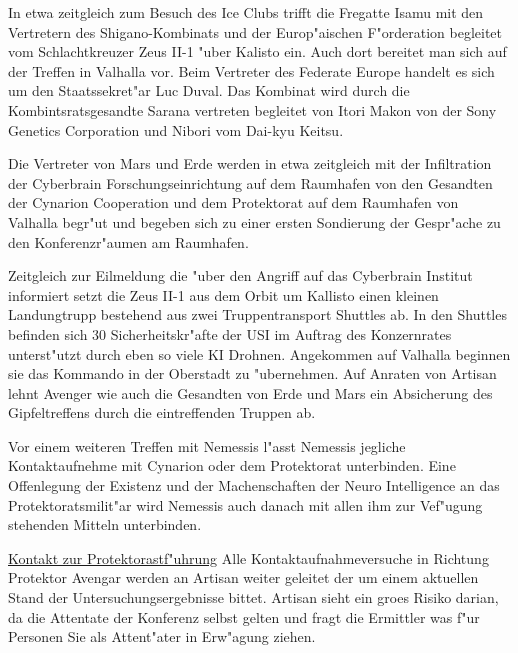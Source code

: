 In etwa zeitgleich zum Besuch des Ice Clubs trifft die Fregatte Isamu mit den Vertretern des Shigano-Kombinats und der Europ"aischen F"orderation begleitet vom Schlachtkreuzer Zeus II-1 "uber Kalisto ein. Auch dort bereitet man sich auf der Treffen in Valhalla vor.
Beim Vertreter des Federate Europe handelt es sich um den Staatssekret"ar Luc Duval. Das Kombinat wird durch die Kombintsratsgesandte Sarana vertreten begleitet von Itori Makon von der Sony Genetics Corporation und Nibori vom Dai-kyu Keitsu.

Die Vertreter von Mars und Erde werden in etwa zeitgleich mit der Infiltration der Cyberbrain Forschungseinrichtung auf dem Raumhafen von den Gesandten der Cynarion Cooperation und dem Protektorat auf dem Raumhafen von Valhalla begr"u\3t und begeben sich zu einer ersten Sondierung der Gespr"ache zu den Konferenzr"aumen am Raumhafen.


Zeitgleich zur Eilmeldung die "uber den Angriff auf das Cyberbrain Institut informiert setzt die Zeus II-1 aus dem Orbit um Kallisto einen kleinen Landungtrupp bestehend aus zwei Truppentransport Shuttles ab. In den Shuttles befinden sich 30 Sicherheitskr"afte der USI im Auftrag des Konzernrates unterst"utzt durch eben so viele KI Drohnen. Angekommen auf Valhalla beginnen sie das Kommando in der Oberstadt zu "ubernehmen. Auf Anraten von Artisan lehnt Avenger wie auch die Gesandten von Erde und Mars ein Absicherung des Gipfeltreffens durch die eintreffenden Truppen ab.


Vor einem weiteren Treffen mit Nemessis l"asst Nemessis jegliche Kontaktaufnehme mit Cynarion oder dem Protektorat unterbinden. Eine Offenlegung der Existenz und der Machenschaften der Neuro Intelligence an das Protektoratsmilit"ar wird Nemessis auch danach mit allen ihm zur Vef"ugung stehenden Mitteln unterbinden.

\underline{Kontakt zur Protektorastf"uhrung} Alle Kontaktaufnahmeversuche in Richtung Protektor Avengar werden an Artisan weiter geleitet der um einem aktuellen Stand der Untersuchungsergebnisse bittet. Artisan sieht ein gro\3es Risiko darian, da\3 die Attentate der Konferenz selbst gelten und fragt die Ermittler was f"ur Personen Sie als Attent"ater in Erw"agung ziehen.

